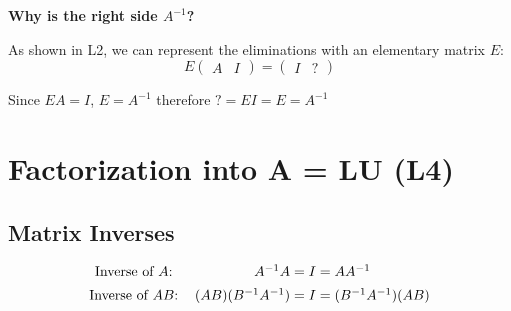 \documentclass[12pt]{article}
\begin{document}
$\>$

\textbf{Why is the right side $A^{-1}$?}

As shown in L2, we can represent the eliminations with an elementary matrix $E$:
\[E
\left(
    \begin{array}{c|c}
        A & I
    \end{array}
\right)
=
\left(
    \begin{array}{c|c}
        I & ?
    \end{array}
\right)
\]

Since $EA=I$, $E=A^{-1}$ therefore $?=EI=E=A^{-1}$

\newpage

\section{Factorization into A = LU (L4)}

\subsection{Matrix Inverses}

\[
\begin{tabular}{cc}
    \text{Inverse of $A$:} & $A^{-1}A = I = AA^{-1}$\\[5pt]
    \text{Inverse of $AB$:} & $(AB)(B^{-1}A^{-1}) = I = (B^{-1}A^{-1})(AB)$
\end{tabular}
\]
\end{document}
